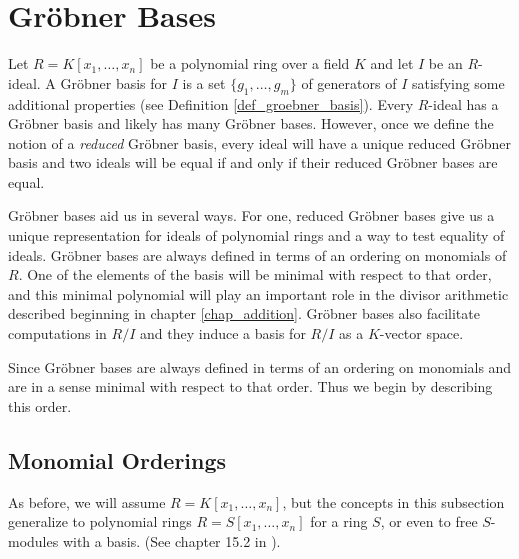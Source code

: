 

\section{Gr\"obner Bases}
\label{chap_groebner}

Let $R = K[x_1, \ldots, x_n]$ be a polynomial ring over a field $K$
and let $I$ be an $R$-ideal.
A Gr\"obner basis for $I$ is a set $\{g_1, \ldots, g_m\}$ of generators of $I$
satisfying some additional properties (see Definition \ref{def_groebner_basis}).
Every $R$-ideal has a Gr\"obner basis and likely has many Gr\"obner bases.
However, once we define the notion of a \emph{reduced} Gr\"obner basis,
every ideal will have a unique reduced Gr\"obner basis
and two ideals will be equal if and only if their reduced Gr\"obner bases are equal.

Gr\"obner bases aid us in several ways.
For one, reduced Gr\"obner bases give us a unique representation for ideals of polynomial rings
and a way to test equality of ideals.
Gr\"obner bases are always defined in terms of an ordering on monomials of $R$.
One of the elements of the basis will be minimal with respect to that order,
and this minimal polynomial will play an important role in the divisor arithmetic
described beginning in chapter \ref{chap_addition}.
Gr\"obner bases also facilitate computations in $R/I$ and they induce a basis for $R/I$ as a $K$-vector space.

Since Gr\"obner bases are always defined in terms of an ordering on monomials
and are in a sense minimal with respect to that order.
Thus we begin by describing this order.




\subsection{Monomial Orderings}

As before, we will assume $R = K[x_1, \ldots, x_n]$,
but the concepts in this subsection generalize to polynomial rings $R = S[x_1, \ldots, x_n]$ for a ring $S$,
or even to free $S$-modules with a basis. (See chapter 15.2 in \cite{eisenbud95}).

